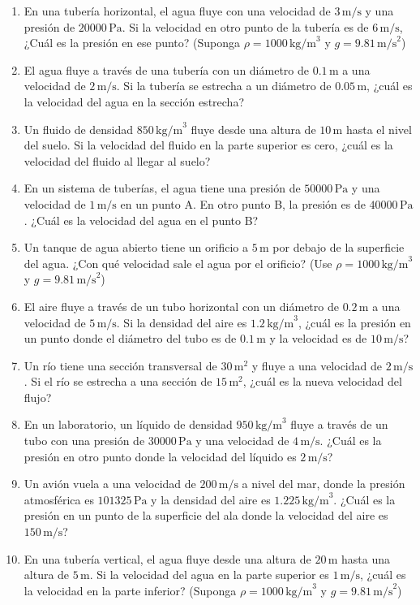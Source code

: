 \documentclass[../main]{subfiles}
\begin{document}
\begin{enumerate}
\item En una tubería horizontal, el agua fluye con una velocidad de $3 \, \text{m/s}$ y una presión de $20000 \, \text{Pa}$. Si la velocidad en otro punto de la tubería es de $6 \, \text{m/s}$, ¿Cuál es la presión en ese punto? (Suponga $\rho = 1000 \, \text{kg/m}^3$ y $g = 9.81 \, \text{m/s}^2$)
\item El agua fluye a través de una tubería con un diámetro de $0.1 \, \text{m}$ a una velocidad de $2 \, \text{m/s}$. Si la tubería se estrecha a un diámetro de $0.05 \, \text{m}$, ¿cuál es la velocidad del agua en la sección estrecha?
\item Un fluido de densidad $850 \, \text{kg/m}^3$ fluye desde una altura de $10 \, \text{m}$ hasta el nivel del suelo. Si la velocidad del fluido en la parte superior es cero, ¿cuál es la velocidad del fluido al llegar al suelo?
\item En un sistema de tuberías, el agua tiene una presión de $50000 \, \text{Pa}$ y una velocidad de $1 \, \text{m/s}$ en un punto A. En otro punto B, la presión es de $40000 \, \text{Pa}$. ¿Cuál es la velocidad del agua en el punto B?
\item Un tanque de agua abierto tiene un orificio a $5 \, \text{m}$ por debajo de la superficie del agua. ¿Con qué velocidad sale el agua por el orificio? (Use $\rho = 1000 \, \text{kg/m}^3$ y $g = 9.81 \, \text{m/s}^2$)
\item El aire fluye a través de un tubo horizontal con un diámetro de $0.2 \, \text{m}$ a una velocidad de $5 \, \text{m/s}$. Si la densidad del aire es $1.2 \, \text{kg/m}^3$, ¿cuál es la presión en un punto donde el diámetro del tubo es de $0.1 \, \text{m}$ y la velocidad es de $10 \, \text{m/s}$?
\item Un río tiene una sección transversal de $30 \, \text{m}^2$ y fluye a una velocidad de $2 \, \text{m/s}$. Si el río se estrecha a una sección de $15 \, \text{m}^2$, ¿cuál es la nueva velocidad del flujo?
\item En un laboratorio, un líquido de densidad $950 \, \text{kg/m}^3$ fluye a través de un tubo con una presión de $30000 \, \text{Pa}$ y una velocidad de $4 \, \text{m/s}$. ¿Cuál es la presión en otro punto donde la velocidad del líquido es $2 \, \text{m/s}$?
\item Un avión vuela a una velocidad de $200 \, \text{m/s}$ a nivel del mar, donde la presión atmosférica es $101325 \, \text{Pa}$ y la densidad del aire es $1.225 \, \text{kg/m}^3$. ¿Cuál es la presión en un punto de la superficie del ala donde la velocidad del aire es $150 \, \text{m/s}$?
\item En una tubería vertical, el agua fluye desde una altura de $20 \, \text{m}$ hasta una altura de $5 \, \text{m}$. Si la velocidad del agua en la parte superior es $1 \, \text{m/s}$, ¿cuál es la velocidad en la parte inferior? (Suponga $\rho = 1000 \, \text{kg/m}^3$ y $g = 9.81 \, \text{m/s}^2$)

\end{enumerate}
\end{document}
